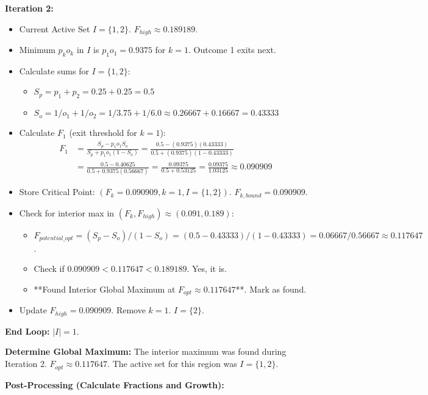 \documentclass[11pt, letterpaper]{article}
\theoremstyle{definition}
\begin{document}
\textbf{Iteration 2:}
\begin{itemize}
    \item Current Active Set $I = \{1, 2\}$. $F_{high} \approx 0.189189$.
    \item Minimum $p_k o_k$ in $I$ is $p_1 o_1 = 0.9375$ for $k=1$. Outcome 1 exits next.
    \item Calculate sums for $I=\{1, 2\}$:
        \begin{itemize}
            \item $S_p = p_1+p_2 = 0.25 + 0.25 = 0.5$
            \item $S_o = 1/o_1 + 1/o_2 = 1/3.75 + 1/6.0 \approx 0.26667 + 0.16667 = 0.43333$
        \end{itemize}
    \item Calculate $F_1$ (exit threshold for $k=1$):
        \begin{align*}
           F_1 &= \frac{S_p - p_1 o_1 S_o}{S_p + p_1 o_1 (1 - S_o)} = \frac{0.5 - (0.9375)(0.43333)}{0.5 + (0.9375)(1 - 0.43333)} \\
               &= \frac{0.5 - 0.40625}{0.5 + 0.9375(0.56667)} = \frac{0.09375}{0.5 + 0.53125} = \frac{0.09375}{1.03125} \approx 0.090909
        \end{align*}
    \item Store Critical Point: $(F_k=0.090909, k=1, I=\{1, 2\})$. $F_{k,bound}=0.090909$.
    \item Check for interior max in $(F_k, F_{high}) \approx (0.091, 0.189)$:
        \begin{itemize}
            \item $F_{potential\_opt} = (S_p - S_o) / (1 - S_o) = (0.5 - 0.43333) / (1 - 0.43333) = 0.06667 / 0.56667 \approx 0.117647$.
            \item Check if $0.090909 < 0.117647 < 0.189189$. Yes, it is.
            \item **Found Interior Global Maximum at $F_{opt} \approx 0.117647$**. Mark as found.
        \end{itemize}
    \item Update $F_{high} = 0.090909$. Remove $k=1$. $I = \{2\}$.
\end{itemize}

\textbf{End Loop:} $|I|=1$.

\textbf{Determine Global Maximum:}
The interior maximum was found during Iteration 2.
$F_{opt} \approx 0.117647$. The active set for this region was $I = \{1, 2\}$.

\textbf{Post-Processing (Calculate Fractions and Growth):}
\end{document}
